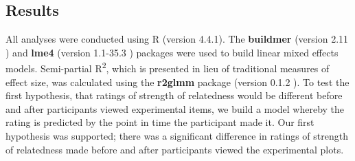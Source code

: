 \documentclass[manuscript,screen,review]{acmart}
\begin{document}
\subsection{Results}\label{sec-results-main}

All analyses were conducted using R (version 4.4.1). The
\textbf{buildmer} (version 2.11 \citep{buildmer}) and \textbf{lme4}
(version 1.1-35.3 \citep{lme4}) packages were used to build linear mixed
effects models. Semi-partial R\textsuperscript{2}, which is presented in
lieu of traditional measures of effect size, was calculated using the
\textbf{r2glmm} package (version 0.1.2 \citep{r2glmm}). To test the
first hypothesis, that ratings of strength of relatedness would be
different before and after participants viewed experimental items, we
build a model whereby the rating is predicted by the point in time the
participant made it. Our first hypothesis was supported; there was a
significant difference in ratings of strength of relatedness made before
and after participants viewed the experimental plots.

\begin{table}

\caption{\label{tbl-abso-diff}Statistics for the significant main effect
of rating time. Semi-partial R\textsuperscript{2} is also incuded.}


\end{table}%
\end{document}
